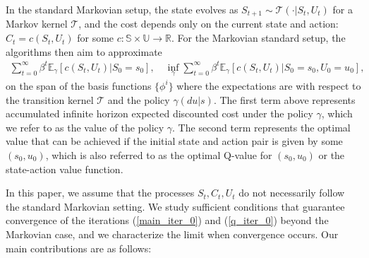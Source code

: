 \documentclass[11pt]{article}
\begin{document}
In the standard Markovian setup, the state evolves as $S_{t+1} \sim \mathcal{T}(\cdot|S_t,U_t)$ for a Markov kernel $\mathcal{T}$, and the cost depends only on the current state and action: $C_t = c(S_t,U_t)$ for some $c:\mathds{S\times U}\to\mathds{R}$.  For the Markovian standard setup, the algorithms then aim to approximate 
\begin{align*}
\sum_{t=0}^\infty \beta^t \mathbb{E}_\gamma[c(S_t,U_t)|S_0=s_0], \quad 
\inf_\gamma \sum_{t=0}^\infty \beta^t \mathbb{E}_\gamma[c(S_t,U_t)|S_0=s_0,U_0=u_0],
\end{align*}
on the span of the basis functions $\{\phi^i\}$ where the expectations are with respect to the transition kernel $\mathcal{T}$ and the policy $\gamma(du|s)$.  The first term above represents accumulated infinite horizon expected discounted cost under the policy $\gamma$, which we refer to as  the value of the policy $\gamma$. The second term represents the optimal value that can be achieved if the initial state and action pair is given by some $(s_0,u_0)$, which is also referred to as the optimal Q-value for $(s_0,u_0)$ or the state-action value function.



In this paper, we assume that the processes $S_t, C_t, U_t$ do not necessarily follow the standard Markovian setting. We study sufficient conditions that guarantee convergence of the iterations (\ref{main_iter_0}) and (\ref{q_iter_0}) beyond the Markovian case, and we characterize the limit when convergence occurs. Our main contributions are as follows:
\end{document}
